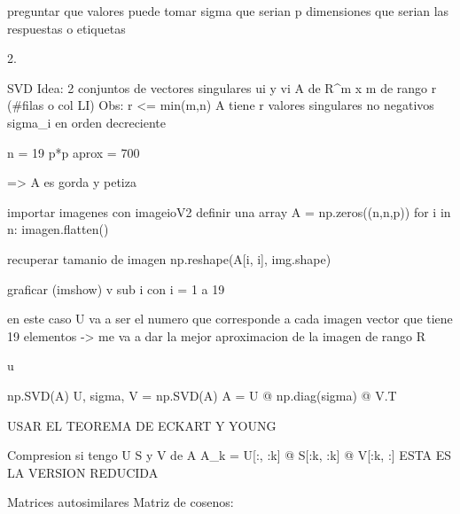 preguntar que valores puede tomar sigma
que serian p dimensiones
que serian las respuestas o etiquetas


2. 

SVD
Idea: 2 conjuntos de vectores singulares {ui} y {vi} 
A de R^{m x m} de rango r (#filas o col LI)
Obs: r <= min(m,n)
A tiene r valores singulares no negativos {sigma_i} en orden decreciente


n = 19
p*p aprox = 700

=> A es gorda y petiza

importar imagenes con imageioV2
definir una array A = np.zeros((n,n,p))
for i in n:
    imagen.flatten()

recuperar tamanio de imagen
np.reshape(A[i, i], img.shape)

graficar (imshow)
    v sub i con i = 1 a 19

en este caso U va a ser el numero que corresponde a cada imagen
    vector que tiene 19 elementos
-> me va a dar la mejor aproximacion de la imagen de rango R

u

np.SVD(A)
U, sigma, V = np.SVD(A)
A = U @ np.diag(sigma) @ V.T

USAR EL TEOREMA DE ECKART Y YOUNG



Compresion
si tengo U S y V de A
A_k = U[:, :k] @ S[:k, :k] @ V[:k, :]
ESTA ES LA VERSION REDUCIDA 

Matrices autosimilares
    Matriz de cosenos:
        
